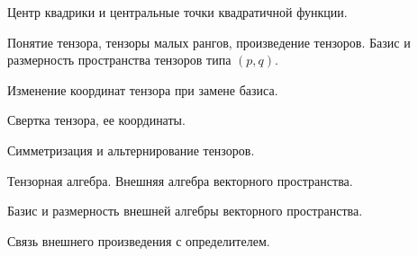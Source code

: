 \documentclass[a4paper]{article}
\begin{document}
\begin{nums}{-2}
\item Центр квадрики и центральные точки квадратичной функции.
\item Понятие тензора, тензоры малых рангов, произведение тензоров. Базис и
размерность пространства тензоров типа $(p,q)$.
\item Изменение координат тензора при замене базиса.
\item Свертка тензора, ее координаты.
\item Симметризация и альтернирование тензоров.
\item Тензорная алгебра. Внешняя алгебра векторного пространства.
\item Базис и размерность внешней алгебры векторного пространства.
\item Связь внешнего произведения с определителем.
\end{nums}

\medskip\dmvntrail
\end{document}
